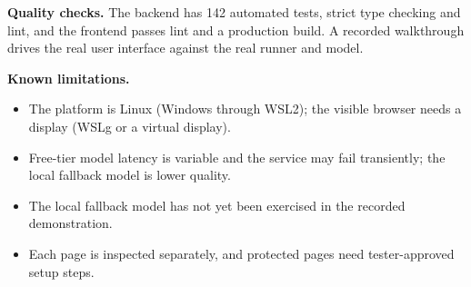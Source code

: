 \documentclass[11pt,a4paper]{article}
\begin{document}
\medskip
\textbf{Quality checks.} The backend has 142 automated tests, strict type checking and lint, and the frontend passes lint and a production build. A recorded walkthrough drives the real user interface against the real runner and model.

\textbf{Known limitations.}
\begin{itemize}
  \item The platform is Linux (Windows through WSL2); the visible browser needs a display (WSLg or a virtual display).
  \item Free-tier model latency is variable and the service may fail transiently; the local fallback model is lower quality.
  \item The local fallback model has not yet been exercised in the recorded demonstration.
  \item Each page is inspected separately, and protected pages need tester-approved setup steps.
\end{itemize}
\end{document}
